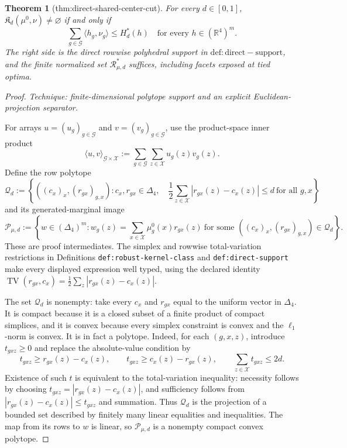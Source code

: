 \documentclass{article}
\newtheorem{theorem}{Theorem}
\begin{document}
\begin{theorem}[thm:direct-shared-center-cut]\label{thm:direct-shared-center-cut}
For every \(d\in[0,1]\), \(\mathfrak K_d(\mu^0,\nu)\neq\varnothing\) if and only if \[\sum_{g\in\mathcal G}\langle h_g,\nu_g\rangle\le H_d^*(h)\quad\text{for every }h\in(\mathbb R^4)^m.\] The right side is the direct rowwise polyhedral support in \(\mathrm{def:direct-support}\), and the finite normalized set \(\mathcal R_{\mu,d}^*\) suffices, including facets exposed at tied optima.
\end{theorem}
\begin{proof}
\emph{Technique: finite-dimensional polytope support and an explicit Euclidean-projection separator.}

For arrays \(u=(u_g)_{g\in\mathcal G}\) and \(v=(v_g)_{g\in\mathcal G}\), use the product-space inner product
\[
 \langle u,v\rangle_{\mathcal G\times\mathcal X}
 :=\sum_{g\in\mathcal G}\sum_{z\in\mathcal X}u_g(z)v_g(z).
\]
Define the row polytope
\[
 \mathcal Q_d:=\left\{((c_x)_x,(r_{gx})_{g,x}):
 c_x,r_{gx}\in\Delta_4,\quad
 \frac12\sum_{z\in\mathcal X}|r_{gx}(z)-c_x(z)|\le d
 \ \text{for all }g,x\right\}
\]
and its generated-marginal image
\[
 \mathcal P_{\mu,d}:=\left\{w\in(\Delta_4)^m:
 w_g(z)=\sum_{x\in\mathcal X}\mu_g^0(x)r_{gx}(z)
 \ \text{for some }((c_x)_x,(r_{gx})_{g,x})\in\mathcal Q_d\right\}.
\]
These are proof intermediates.  The simplex and rowwise total-variation restrictions in Definitions \texttt{def:robust-kernel-class} and \texttt{def:direct-support} make every displayed expression well typed, using the declared identity
\(\operatorname{TV}(r_{gx},c_x)=\frac12\sum_z|r_{gx}(z)-c_x(z)|\).

The set \(\mathcal Q_d\) is nonempty: take every \(c_x\) and \(r_{gx}\) equal to the uniform vector in \(\Delta_4\).  It is compact because it is a closed subset of a finite product of compact simplices, and it is convex because every simplex constraint is convex and the \(\ell_1\)-norm is convex.  It is in fact a polytope.  Indeed, for each \((g,x,z)\), introduce \(t_{gxz}\ge0\) and replace the absolute-value condition by
\[
 t_{gxz}\ge r_{gx}(z)-c_x(z),\qquad
 t_{gxz}\ge c_x(z)-r_{gx}(z),\qquad
 \sum_{z\in\mathcal X}t_{gxz}\le2d.
\]
Existence of such \(t\) is equivalent to the total-variation inequality: necessity follows by choosing
\(t_{gxz}=|r_{gx}(z)-c_x(z)|\), and sufficiency follows from
\(|r_{gx}(z)-c_x(z)|\le t_{gxz}\) and summation.  Thus \(\mathcal Q_d\) is the projection of a bounded set described by finitely many linear equalities and inequalities.  The map from its rows to \(w\) is linear, so \(\mathcal P_{\mu,d}\) is a nonempty compact convex polytope.


\end{proof}
\end{document}
